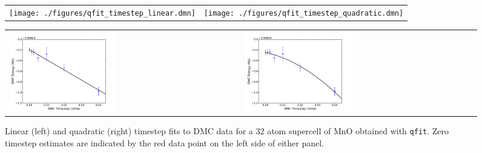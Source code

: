 \begin{figure}
  \centering
\ifdefined\HCode%
  \begin{tabularx}{1024pt}{X X}
    \texttt{[image: ./figures/qfit\_timestep\_linear.dmn]}&
    \texttt{[image: ./figures/qfit\_timestep\_quadratic.dmn]}\\
  \end{tabularx}
\else%
  \begin{tabularx}{\textwidth}{X X}
    \includegraphics[trim=0mm 0mm 4mm 0mm,clip,width=0.47\textwidth]{./figures/qfit_timestep_linear.pdf}&
    \includegraphics[trim=2mm 0mm 4mm 0mm,clip,width=0.47\textwidth]{./figures/qfit_timestep_quadratic.pdf}\\
    \end{tabularx}
\fi%
\caption{Linear (left) and quadratic (right) timestep fits to DMC data for a 32 atom supercell of MnO obtained with \texttt{qfit}.  Zero timestep estimates are indicated by the red data point on the left side of either panel.}
  \label{fig:qfit_timestep}
\end{figure}

